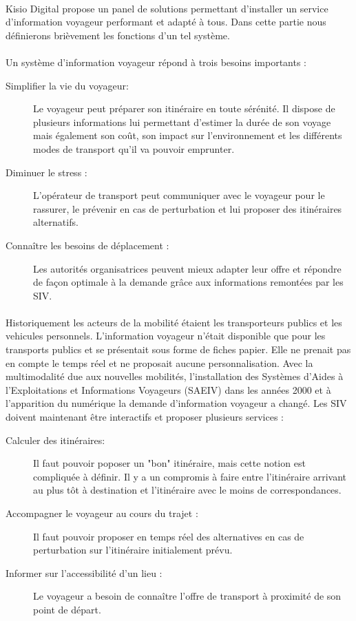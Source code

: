 \documentclass[a4paper]{report}
\begin{document}
\paragraph{} Kisio Digital propose un panel de solutions permettant d'installer un service d'information voyageur performant et adapté à tous. Dans cette partie nous définierons brièvement les fonctions d'un tel système. 

\paragraph{} Un système d'information voyageur répond à trois besoins importants : 
				
\begin{description}
	\item[Simplifier la vie du voyageur:] Le voyageur peut préparer son itinéraire en toute sérénité. Il dispose de plusieurs informations lui permettant d'estimer la durée de son voyage mais également son coût, son impact sur l'environnement et les différents modes de transport qu'il va pouvoir emprunter.
	\item[Diminuer le stress :] L'opérateur de transport peut communiquer avec le voyageur pour le rassurer, le prévenir en cas de perturbation et lui proposer des itinéraires alternatifs.
	\item[Connaître les besoins de déplacement :] Les autorités organisatrices peuvent mieux adapter leur offre et répondre de façon optimale à la demande grâce aux informations remontées par les SIV.
\end{description}

\paragraph{} Historiquement les acteurs de la mobilité étaient les transporteurs publics et les vehicules personnels. L'information voyageur n'était disponible que pour les transports publics et se présentait sous forme de fiches papier. Elle ne prenait pas en compte le temps réel et ne proposait aucune personnalisation. Avec la multimodalité due aux nouvelles mobilités, l'installation des Systèmes d'Aides à l'Exploitations et Informations Voyageurs (SAEIV) dans les années 2000  et à l'apparition du numérique la demande d'information voyageur a changé. Les SIV doivent maintenant être interactifs et proposer plusieurs services :
				
\begin{description}
	\item[Calculer des itinéraires:]  Il faut pouvoir poposer un "bon" itinéraire, mais cette notion est compliquée à définir. Il y a un compromis à faire entre l'itinéraire arrivant au plus tôt à destination et l'itinéraire avec le moins de correspondances.
	\item[Accompagner le voyageur au cours du trajet :] Il faut pouvoir proposer en temps réel des alternatives en cas de perturbation sur l'itinéraire initialement prévu.
	\item[Informer sur l'accessibilité d'un lieu :] Le voyageur a besoin de connaître l'offre de transport à proximité de son point de départ.
\end{description}
\end{document}
